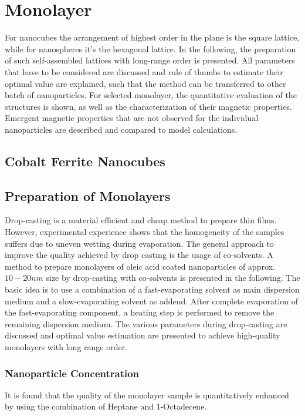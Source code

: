 \documentclass[\main/dresen_thesis.tex]{subfiles}
\renewcommand{\thisPath}{\main/chapters/monolayers}
\begin{document}
  \chapter{Monolayer}\label{ch:monolayers}
    For nanocubes the arrangement of highest order in the plane is the square lattice, while for nanospheres it's the hexagonal lattice.
    In the following, the preparation of such self-assembled lattices with long-range order is presented.
    All parameters that have to be considered are discussed and rule of thumbs to estimate their optimal value are explained, such that the method can be transferred to other batch of nanoparticles.
    For selected monolayer, the quantitative evaluation of the structures is shown, as well as the characterization of their magnetic properties. Emergent magnetic properties that are not observed for the individual nanoparticles are described and compared to model calculations.

    \section{Cobalt Ferrite Nanocubes}
      

    \section{Preparation of Monolayers}
      Drop-casting is a material efficient and cheap method to prepare thin films.
      However, experimental experience shows that the homogeneity of the samples suffers due to uneven wetting during evaporation.
      The general approach to improve the quality achieved by drop casting is the usage of co-solvents.
      A method to prepare monolayers of oleic acid coated nanoparticles of approx. $10 - 20 \unit{nm}$ size by drop-casting with co-solvents is presented in the following.
      The basic idea is to use a combination of a fast-evaporating solvent as main dispersion medium and a slow-evaporating solvent as addend.
      After complete evaporation of the fast-evaporating component, a heating step is performed to remove the remaining dispersion medium.
      The various parameters during drop-casting are discussed and optimal value estimation are presented to achieve high-quality monolayers with long range order.

      \subsection{Nanoparticle Concentration}
        It is found that the quality of the monolayer sample is quantitatively enhanced by using the combination of Heptane and 1-Octadecene.
\end{document}
